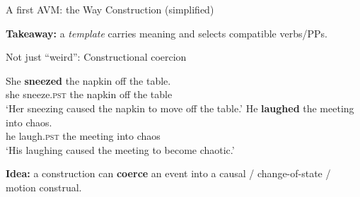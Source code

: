 \begin{frame}{A first AVM: the Way Construction (simplified)}

\vspace{0.5em}
\textbf{Takeaway:} a \emph{template} carries meaning and selects compatible verbs/PPs.
\end{frame}

\begin{frame}{Not just “weird”: Constructional coercion}
\small
 \label{ex:coercion}
\begin{exe}
  \ex \gll She \textbf{sneezed} the napkin off the table.\\
      she sneeze.\textsc{pst} the napkin off the table\\
      \glt `Her sneezing caused the napkin to move off the table.'
  \ex \gll He \textbf{laughed} the meeting into chaos.\\
      he laugh.\textsc{pst} the meeting into chaos\\
      \glt `His laughing caused the meeting to become chaotic.'
\end{exe}


\vspace{0.5em}
\textbf{Idea:} a construction can \textbf{coerce} an event into a causal / change-of-state / motion construal.
\end{frame}

